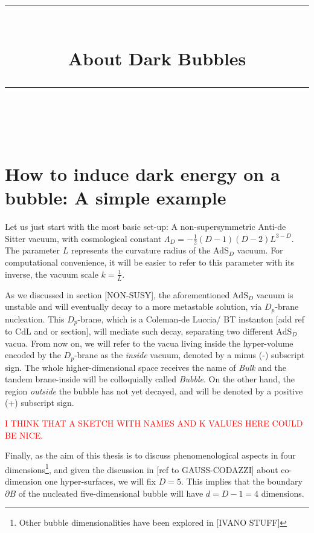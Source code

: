 \documentclass[12pt, a4paper]{article} %
\title{	
	\normalfont\normalsize
	\textsc{}\\ %
	\vspace{5pt} %
	\rule{\linewidth}{0.2pt}\\ %
	\vspace{10pt} %
	{\huge About Dark Bubbles}\\ %
	\vspace{5pt} %
	\rule{\linewidth}{-2pt}\\ %
	\vspace{-25pt} %
	\date{}
}
\author{}
\begin{document}
\maketitle 
\tableofcontents




\newpage
\section{How to induce dark energy on a bubble: A simple example}

Let us just start with the most basic set-up: A non-supersymmetric Anti-de Sitter vacuum, with cosmological constant $\Lambda_{D} = - \tfrac{1}{2}(D-1)(D-2)L^{3-D}$. The parameter $L$ represents the curvature radius of the $\text{AdS}_{D}$ vacuum. For computational convenience, it will be easier to refer to this parameter with its inverse, the vacuum scale $k = \tfrac{1}{L}$.

As we discussed in section [NON-SUSY], the aforementioned $\text{AdS}_{D}$ vacuum is unstable and will eventually decay to a more metastable solution, via $D_{p}$-brane nucleation. This $D_{p}$-brane, which is a Coleman-de Luccia/ BT instanton [add ref to CdL and or section], will mediate such decay, separating two different $\text{AdS}_{D}$ vacua. From now on, we will refer to the vacua living inside the hyper-volume encoded by the $D_{p}$-brane as the \textit{inside} vacuum, denoted by a minus (-) subscript sign. The whole higher-dimensional space receives the name of \textit{Bulk} and the tandem brane-inside will be colloquially called \textit{Bubble}. On the other hand, the region \textit{outside} the bubble has not yet decayed, and will be denoted by a positive (+) subscript sign.

\textcolor{red}{I THINK THAT A SKETCH WITH NAMES AND K VALUES HERE COULD BE NICE.}

Finally, as the aim of this thesis is to discuss phenomenological aspects in four dimensions\footnote{Other bubble dimensionalities have been explored in [IVANO STUFF]}, and given the discussion in [ref to GAUSS-CODAZZI] about co-dimension one hyper-surfaces, we will fix $D=5$. This implies that the boundary $\partial B$ of the nucleated five-dimensional bubble will have $d = D-1 = 4$ dimensions.
\end{document}
